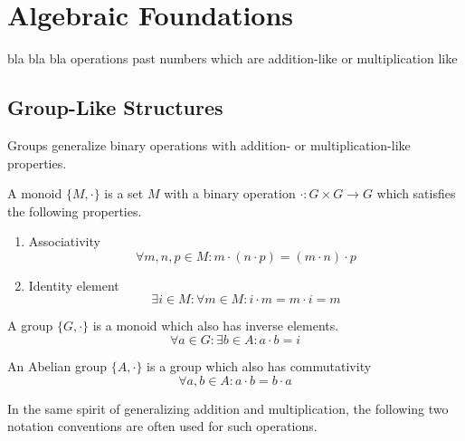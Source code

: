 \chapter{Algebraic Foundations}
\label{chapter:Algebraic-Foundations}


bla bla bla operations past numbers which are addition-like or multiplication like

\section{Group-Like Structures}

Groups generalize binary operations with addition- or multiplication-like properties.

\begin{definition}[Monoid]
	A monoid $\{ M, \cdot \}$ is a set $M$ with a binary operation $\cdot: G \times G \rightarrow G$ which satisfies the following properties.
	\begin{enumerate}
		\item Associativity
		\begin{equation}
			\forall m, n, p \in M: m \cdot (n \cdot p) = (m \cdot n) \cdot p
		\end{equation}
		\item Identity element
		\begin{equation}
			\exists i \in M: \forall m \in M: i \cdot m = m \cdot i = m
		\end{equation}
	\end{enumerate}
\end{definition}

\begin{definition}[Group]
	A group $\{ G, \cdot \}$ is a monoid which also has inverse elements.
	\begin{equation}
		\forall a \in G: \exists b \in A: a \cdot b = i
	\end{equation}
\end{definition}

\begin{definition}
	An Abelian group $\{A, \cdot\}$ is a group which also has commutativity
	\begin{equation}
		\forall a, b \in A: a \cdot b = b \cdot a
	\end{equation}
\end{definition}

In the same spirit of generalizing addition and multiplication, the following two notation conventions are often used for such operations.

